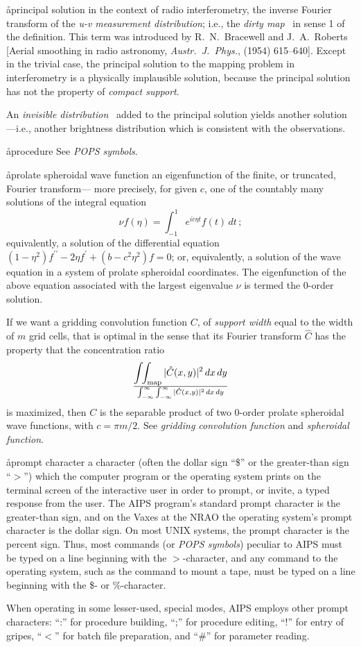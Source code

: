 \aa{principal solution}
in the context of radio interferometry,
the inverse Fourier transform of the {\it u-v measurement distribution};
i.e., the {\it dirty map} \qv\ in sense 1 of the definition.
This term was introduced by R.~N.~Bracewell and J.~A.~Roberts
[Aerial smoothing in radio astronomy, {\it Austr.\ J.~Phys.},
 (1954) 615--640].
Except in the trivial case, the principal solution to the mapping
problem in interferometry is a physically implausible solution,
because the principal solution has not the property of {\it compact support}.
\par
An {\it invisible distribution} \qv\ added to the principal solution
yields another solution---i.e., another
brightness distribution which is consistent with the observations.

\aa{procedure} See {\it POPS symbols}.

\aa{prolate spheroidal wave function}
an eigenfunction of the finite, or truncated, Fourier transform---%
more precisely, for given $c$, one of the countably many solutions
of the integral equation
$$\nu f(\eta)=\int_{-1}^1e^{ic\eta t}f(t)\,dt\,;$$
equivalently, a solution of the differential equation
$(1-\eta^2)f^{\prime\prime}-2\eta f^\prime+(b-c^2\eta^2)f=0$;
or, equivalently, a solution of the wave equation in a system
of prolate spheroidal coordinates.
The eigenfunction of the above equation associated with the largest
eigenvalue $\nu$ is termed the 0-order solution.
\par
If we want a gridding convolution function $C$,
of {\it support width} equal to the width of $m$ grid cells,
that is optimal in the sense that its Fourier transform $\hat C$
has the property that
the concentration ratio
$$\intii_{\operatorname{map}} |\hat C(x,y)|^2\,dx\,dy\over
\int_{-\infty}^\infty\int_{-\infty}^\infty|\hat C(x,y)|^2\,dx\,dy$$
is maximized, then $C$ is the separable product of two
0-order prolate spheroidal wave functions, with $c=\pi m/2$.
See {\it gridding convolution function} and {\it spheroidal function}.

\aa{prompt character}
a character (often the dollar sign ``\$'' or the greater-than
sign ``$>$'') which the computer program or the operating system
prints on the terminal screen of the interactive user in
order to prompt, or invite, a typed response from the user.
The AIPS program's standard prompt character is the greater-than
sign, and on the Vaxes at the NRAO the operating
system's prompt character is the dollar sign.  On most UNIX systems,
the prompt character is the percent sign.  Thus, most commands (or
{\it POPS symbols}\/) peculiar to AIPS must be typed on a line
beginning with the $>$-character, and any command to the
operating system, such as the command to mount a tape,
must be typed on a line beginning with the \$- or \%-character.
\par
When operating in some lesser-used, special modes,
AIPS employs other prompt characters:
``:'' for procedure building, ``;'' for procedure editing,
``!'' for entry of gripes, ``$<$'' for batch file preparation,
and ``\#'' for parameter reading.

